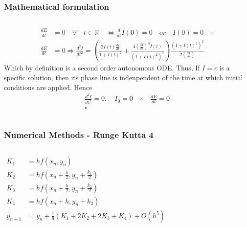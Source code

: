 \documentclass[aspectratio=1610]{beamer}
\begin{document}
\begin{frame}
\frametitle{Mathematical formulation}
\begin{columns}
\column{37em}
\large
\begin{align*}
\frac{dE}{dt} & = 0 \quad \forall \quad t \in \mathbb{R} \quad \Longleftrightarrow \frac{d}{dt}I(0) = 0 \quad or \quad I(0)= 0 \quad \because \\
\frac{dE}{dt} &= 0 \Longrightarrow 
{\frac{d^{2}I}{dt^{2}}}=\left(\frac{2I(t)\frac{dI}{dt}}{1+I(t)^{2}}+\frac{4\left(\frac{dI}{dt}\right)^{3}I(t)}{\left(1+I(t)^{2}\right)^{3}}\right)\frac{\left(1+I(t)^{2}\right)^{2}}{2\left(\frac{dI}{dt}\right)}
\end{align*}
Which by definition is a second order autonomous ODE. Thus, If $I=c$ is a specific solution, then its phase line is indenpendent of the time at which initial conditions are applied. Hence
\begin{align*}
\frac{d^{2}I}{dt^{2}}=0,\quad I_{0}=0 \quad \therefore\quad\frac{dE}{dt}=0\\
\square
\end{align*}
\end{columns}
\end{frame}
\begin{frame}
\frametitle{Numerical Methods - Runge Kutta 4}
\begin{columns}
\column{2em}
\Large
  \begin{align*}
  K_{1}&=hf(x_{n},y_{n})\\
  K_{2}&=hf(x_{n}+\frac{h}{2},y_{n}+\frac{k_{1}}{2})\\
  K_{3}&=hf(x_{n}+\frac{h}{2},y_{n}+\frac{k_{2}}{2})\\
  K_{4}&=hf(x_{n}+h,y_{n}+k_{3})\\
  y_{n+1}&=y_{n}+\frac{1}{6}\left(K_{1}+2K_{2}+2K_{3}+K_{4}\right)+O(h^{5})
  \end{align*}
\end{columns}
\end{frame}
\end{document}
